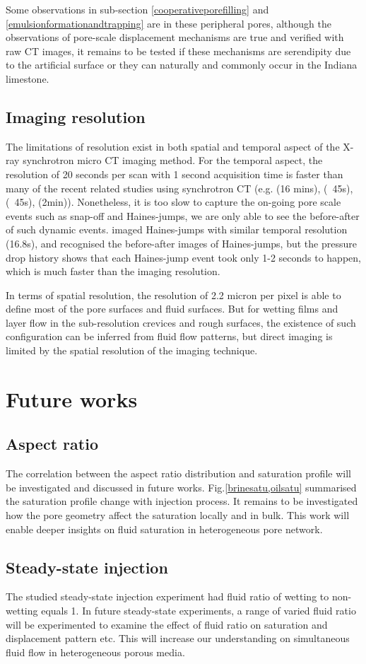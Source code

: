 Some observations in sub-section \ref{cooperativeporefilling} and \ref{emulsionformationandtrapping} are in these peripheral pores, although the observations of pore-scale displacement mechanisms are true and verified with raw CT images, it remains to be tested if these mechanisms are serendipity due to the artificial surface or they can naturally and commonly occur in the Indiana limestone.

\subsection{Imaging resolution}
The limitations of resolution exist in both spatial and temporal aspect of the X-ray synchrotron micro CT imaging method. For the temporal aspect, the resolution of 20 seconds per scan with 1 second acquisition time is faster than many of the recent related studies using synchrotron CT (e.g. \citet{ramskill2016fast} (16 mins),\citet{menke2016reservoir} (~45s),\cite{menke2017dynamic} (~45s), \cite{khanamiri2018fluid} (2min)). Nonetheless, it is too slow to capture the on-going pore scale events such as snap-off and Haines-jumps, we are only able to see the before-after of such dynamic events. \citet{berg2013real} imaged Haines-jumps with similar temporal resolution (16.8s), and recognised the before-after images of Haines-jumps, but the pressure drop history shows that each Haines-jump event took only 1-2 seconds to happen, which is much faster than the imaging resolution.

In terms of spatial resolution, the resolution of 2.2 micron per pixel is able to define most of the pore surfaces and fluid surfaces. But for wetting films and layer flow in the sub-resolution crevices and rough surfaces, the existence of such configuration can be inferred from fluid flow patterns, but direct imaging is limited by the spatial resolution of the imaging technique.

\section{Future works}
\subsection{Aspect ratio}
The correlation between the aspect ratio distribution and saturation profile will be investigated and discussed in future works.  Fig.\ref{brinesatu,oilsatu} summarised the saturation profile change with injection process. It remains to be investigated how the pore geometry affect the saturation locally and in bulk. This work will enable deeper insights on fluid saturation in heterogeneous pore network.
 
\subsection{Steady-state injection}
The studied steady-state injection experiment had fluid ratio of wetting to non-wetting equals 1. In future steady-state experiments, a range of varied fluid ratio will be experimented to examine the effect of fluid ratio on saturation and displacement pattern etc. This will increase our understanding on simultaneous fluid flow in heterogeneous porous media.
